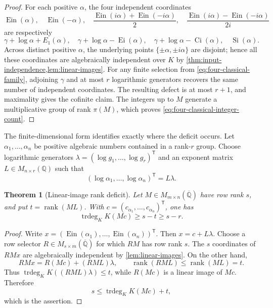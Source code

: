 \documentclass[11pt]{article}
\theoremstyle{keio}
\newtheorem{theorem}{Theorem}[section]
\theoremstyle{definition}
\theoremstyle{remark}
\newcommand{\Q}{\mathbb Q}
\newcommand{\Qbar}{\overline{\mathbb Q}}
\newcommand{\Ein}{\operatorname{Ein}}
\newcommand{\Ei}{\operatorname{Ei}}
\newcommand{\Ci}{\operatorname{Ci}}
\newcommand{\trdeg}{\operatorname{trdeg}}
\begin{document}
\begin{proof}
For each positive \(\alpha\), the four independent coordinates
\[
 \Ein(\alpha),\quad \Ein(-\alpha),\quad
 \frac{\Ein(i\alpha)+\Ein(-i\alpha)}2,\quad
 \frac{\Ein(i\alpha)-\Ein(-i\alpha)}{2i}
\]
are respectively
\[
 \gamma+\log\alpha+E_1(\alpha),\quad
 \gamma+\log\alpha-\Ei(\alpha),\quad
 \gamma+\log\alpha-\Ci(\alpha),\quad
 \operatorname{Si}(\alpha).
\]
Across distinct positive \(\alpha\), the underlying points
\(\{\pm\alpha,\pm i\alpha\}\) are disjoint; hence all these coordinates
are algebraically independent over \(K\) by
\cref{thm:input-independence,lem:linear-images}.  For any finite selection
from \eqref{eq:four-classical-family}, adjoining \(\gamma\) and at most
\(r\) logarithmic generators recovers the same number of independent
coordinates.  The resulting defect is at most \(r+1\), and maximality gives
the cofinite claim.  The integers up to \(M\) generate a multiplicative
group of rank \(\pi(M)\), which proves
\eqref{eq:four-classical-integer-count}.
\end{proof}

The finite-dimensional form identifies exactly where the deficit occurs.
Let \(\alpha_1,\ldots,\alpha_n\) be positive algebraic numbers contained in
a rank-\(r\) group.  Choose logarithmic generators
\(\lambda=(\log g_1,\ldots,\log g_r)^{\mathsf T}\) and an exponent matrix
\(L\in M_{n\times r}(\Q)\) such that
\begin{equation}\label{eq:log-exponent-matrix}
 (\log\alpha_1,\ldots,\log\alpha_n)^{\mathsf T}=L\lambda.
\end{equation}

\begin{theorem}[Linear-image rank deficit]
\label{thm:linear-rank-deficit}
Let \(M\in M_{m\times n}(\Qbar)\) have row rank \(s\), and put
\(t=\operatorname{rank}(ML)\).  With
\(c=(c_{\alpha_1},\ldots,c_{\alpha_n})^{\mathsf T}\), one has
\begin{equation}\label{eq:linear-rank-deficit}
 \boxed{\displaystyle
 \trdeg_KK(Mc)\ge s-t\ge s-r.}
\end{equation}
\end{theorem}

\begin{proof}
Write \(x=(\Ein(\alpha_1),\ldots,\Ein(\alpha_n))^{\mathsf T}\).  Then
\(x=c+L\lambda\).  Choose a row selector
\(R\in M_{s\times m}(\Qbar)\) for which \(RM\) has row rank \(s\).
The \(s\) coordinates of \(RMx\) are algebraically independent by
\cref{lem:linear-images}.  On the other hand,
\[
 RMx=R(Mc)+(RML)\lambda,
 \qquad \operatorname{rank}(RML)\le\operatorname{rank}(ML)=t.
\]
Thus \(\trdeg_KK((RML)\lambda)\le t\), while \(R(Mc)\) is a linear image
of \(Mc\).  Therefore
\[
 s\le \trdeg_KK(Mc)+t,
\]
which is the assertion.
\end{proof}
\end{document}

